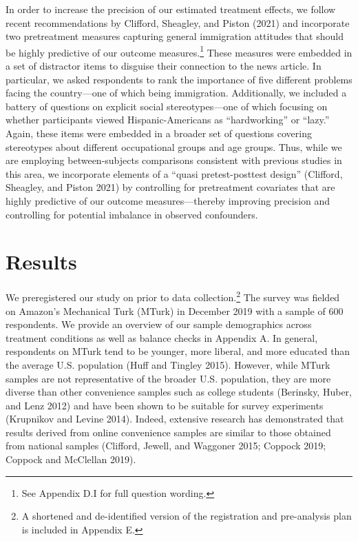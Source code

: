 \documentclass[
  12pt,
]{article}
\begin{document}
In order to increase the precision of our estimated treatment effects,
we follow recent recommendations by Clifford, Sheagley, and Piston
(2021) and incorporate two pretreatment measures capturing general
immigration attitudes that should be highly predictive of our outcome
measures.\footnote{See Appendix D.I for full question wording.} These
measures were embedded in a set of distractor items to disguise their
connection to the news article. In particular, we asked respondents to
rank the importance of five different problems facing the country---one
of which being immigration. Additionally, we included a battery of
questions on explicit social stereotypes---one of which focusing on
whether participants viewed Hispanic-Americans as ``hardworking'' or
``lazy.'' Again, these items were embedded in a broader set of questions
covering stereotypes about different occupational groups and age groups.
Thus, while we are employing between-subjects comparisons consistent
with previous studies in this area, we incorporate elements of a ``quasi
pretest-posttest design'' (Clifford, Sheagley, and Piston 2021) by
controlling for pretreatment covariates that are highly predictive of
our outcome measures---thereby improving precision and controlling for
potential imbalance in observed confounders.

\hypertarget{results}{%
\section{Results}\label{results}}

We preregistered our study on
 prior to data
collection.\footnote{A shortened and de-identified version of the
  registration and pre-analysis plan is included in Appendix E.} The
survey was fielded on Amazon's Mechanical Turk (MTurk) in December 2019
with a sample of 600 respondents. We provide an overview of our sample
demographics across treatment conditions as well as balance checks in
Appendix A. In general, respondents on MTurk tend to be younger, more
liberal, and more educated than the average U.S. population (Huff and
Tingley 2015). However, while MTurk samples are not representative of
the broader U.S. population, they are more diverse than other
convenience samples such as college students (Berinsky, Huber, and Lenz
2012) and have been shown to be suitable for survey experiments
(Krupnikov and Levine 2014). Indeed, extensive research has demonstrated
that results derived from online convenience samples are similar to
those obtained from national samples (Clifford, Jewell, and Waggoner
2015; Coppock 2019; Coppock and McClellan 2019).
\end{document}
